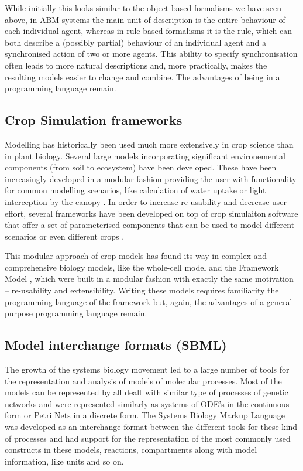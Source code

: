 While initially this looks similar to the object-based formalisms we have seen
above, in ABM systems the main unit of description is the entire behaviour of
each individual agent, whereas in rule-based formalisms it is the rule, which
can both describe a (possibly partial) behaviour of an individual agent and a
synchronised action of two or more agents. This ability to specify
synchronisation often leads to more natural descriptions and, more practically,
makes the resulting models easier to change and combine. The advantages of being
in a programming language remain.

\subsection{Crop Simulation frameworks}
Modelling has historically been used much more extensively in crop science than
in plant biology. Several large models incorporating significant environemental
components (from soil to ecosystem) have been developed. These have been
increasingly developed in a modular fashion providing the user with
functionality for common modelling scenarios, like calculation of water uptake
or light interception by the canopy \citep{keating_overview_2003}. In order to
increase re-usability and decrease user effort, several frameworks have been
developed on top of crop simulaiton software that offer a set of parameterised
components that can be used to model different scenarios or even different crops
\citep{brown_plant_2014}.

This modular approach of crop models has found its way in complex and
comprehensive biology models, like the \citet{karr_whole-cell_2012} whole-cell
model and the Framework Model \citep{chew2014multiscale}, which were built in a
modular fashion with exactly the same motivation -- re-usability and
extensibility. Writing these models requires familiarity the programming
language of the framework but, again, the advantages of a general-purpose
programming language remain.


\subsection{Model interchange formats (SBML)}
The growth of the systems biology movement led to a large number of tools for
the representation and analysis of models of molecular processes. Most of the
models can be represented by all dealt with similar type of processes of genetic
networks and were represented similarly as systems of ODE's in the continuous
form or Petri Nets in a discrete form. The Systems Biology Markup Language
\citep[SMBL;][]{hucka_systems_2003} was developed as an interchange format
between the different tools for these kind of processes and had support for the
representation of the most commonly used constructs in these models, reactions,
compartments along with model information, like units and so on.

